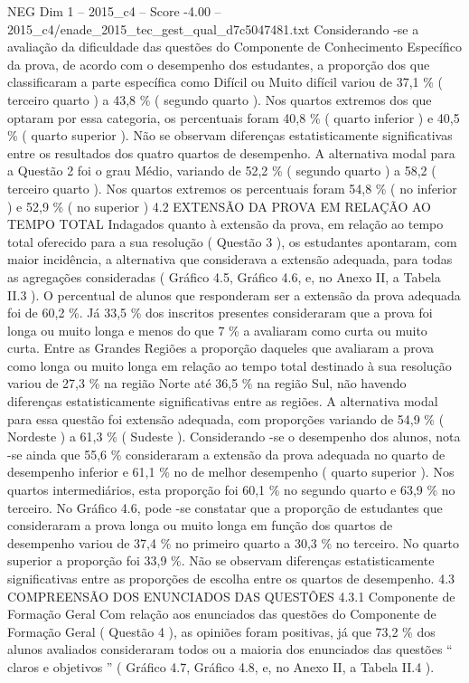 \begin{textsample}{NEG Dim 1 – 2015\_c4 – Score -4.00 – 2015\_c4/enade\_2015\_tec\_gest\_qual\_d7c5047481.txt}
Considerando -se a avaliação da dificuldade das questões do Componente de Conhecimento Específico da prova, de acordo com o desempenho dos estudantes, a proporção dos que classificaram a parte específica como Difícil ou Muito difícil variou de 37,1 \% ( terceiro quarto ) a 43,8 \% ( segundo quarto ).
Nos quartos extremos dos que optaram por essa categoria, os percentuais foram 40,8 \% ( quarto inferior ) e 40,5 \% ( quarto superior ).
Não se observam diferenças estatisticamente significativas entre os resultados dos quatro quartos de desempenho.
A alternativa modal para a Questão 2 foi o grau Médio, variando de 52,2 \% ( segundo quarto ) a 58,2 ( terceiro quarto ).
Nos quartos extremos os percentuais foram 54,8 \% ( no inferior ) e 52,9 \% ( no superior ) 4.2 EXTENSÃO DA PROVA EM RELAÇÃO AO TEMPO TOTAL Indagados quanto à extensão da prova, em relação ao tempo total oferecido para a sua resolução ( Questão 3 ), os estudantes apontaram, com maior incidência, a alternativa que considerava a extensão adequada, para todas as agregações consideradas ( Gráfico 4.5, Gráfico 4.6, e, no Anexo II, a Tabela II.3 ).
O percentual de alunos que responderam ser a extensão da prova adequada foi de 60,2 \%.
Já 33,5 \% dos inscritos presentes consideraram que a prova foi longa ou muito longa e menos do que 7 \% a avaliaram como curta ou muito curta.
Entre as Grandes Regiões a proporção daqueles que avaliaram a prova como longa ou muito longa em relação ao tempo total destinado à sua resolução variou de 27,3 \% na região Norte até 36,5 \% na região Sul, não havendo diferenças estatisticamente significativas entre as regiões.
A alternativa modal para essa questão foi extensão adequada, com proporções variando de 54,9 \% ( Nordeste ) a 61,3 \% ( Sudeste ).
Considerando -se o desempenho dos alunos, nota -se ainda que 55,6 \% consideraram a extensão da prova adequada no quarto de desempenho inferior e 61,1 \% no de melhor desempenho ( quarto superior ).
Nos quartos intermediários, esta proporção foi 60,1 \% no segundo quarto e 63,9 \% no terceiro.
No Gráfico 4.6, pode -se constatar que a proporção de estudantes que consideraram a prova longa ou muito longa em função dos quartos de desempenho variou de 37,4 \% no primeiro quarto a 30,3 \% no terceiro.
No quarto superior a proporção foi 33,9 \%.
Não se observam diferenças estatisticamente significativas entre as proporções de escolha entre os quartos de desempenho. 4.3 COMPREENSÃO DOS ENUNCIADOS DAS QUESTÕES 4.3.1 Componente de Formação Geral Com relação aos enunciados das questões do Componente de Formação Geral ( Questão 4 ), as opiniões foram positivas, já que 73,2 \% dos alunos avaliados consideraram todos ou a maioria dos enunciados das questões “ claros e objetivos ” ( Gráfico 4.7, Gráfico 4.8, e, no Anexo II, a Tabela II.4 ).

\end{textsample}
